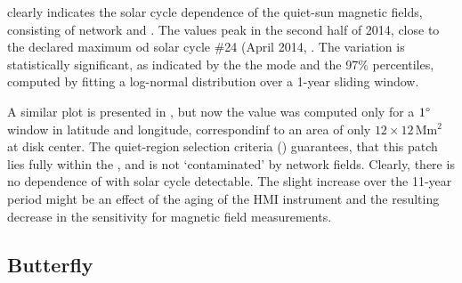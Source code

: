 \documentclass{aa}
\begin{document}
 clearly indicates the solar cycle dependence of the quiet-sun magnetic fields, consisting of network and \IN{}. The \brms{} values peak in the second half of 2014, close to the declared maximum od solar cycle \#24 (April 2014, . The variation is statistically significant, as indicated by the the mode and the 97\% percentiles, computed by fitting a log-normal distribution over a 1-year sliding window.

A similar plot is presented in , but now the \brms{} value was computed only for a $1\degree$ window in latitude and longitude, correspondinf to an area of only $12\times 12$\,Mm$^2$ at disk center. The quiet-region selection criteria () guarantees, that this patch lies fully within the \IN{}, and is not `contaminated' by network fields. Clearly, there is no dependence of \brms{} with solar cycle detectable. The slight increase over the 11-year period might be an effect of the aging of the HMI instrument and the resulting decrease in the sensitivity for magnetic field measurements.




\subsection{Butterfly}
\end{document}
